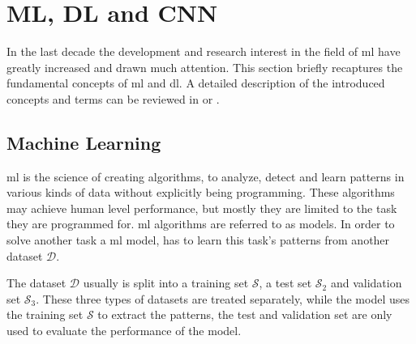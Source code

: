 
\section{ML, DL and CNN}\label{ord:ch2:sec1}

In the last decade the development and research interest in the field of \gls{ml} have greatly increased and drawn much attention. 
This section briefly recaptures the fundamental concepts of \gls{ml} and \gls{dl}.
A detailed description of the introduced concepts and terms can be reviewed in \cite{Ger17-HandsOn} or \cite{Goodfellow-et-al-2016}.


\subsection{Machine Learning}\label{ord:ch2:sec1:subsec1}

\gls{ml} is the science of creating algorithms, to analyze, detect and learn patterns in various kinds of data without explicitly being programming.
These algorithms may achieve human level performance, but mostly they are limited to the task they are programmed for.
\gls{ml} algorithms are referred to as models.
In order to solve another task a \gls{ml} model, has to learn this task's patterns from another dataset $\mathcal{D}$.

The dataset $\mathcal{D}$ usually is split into a training set $\mathcal{S}$, a test set $\mathcal{S}_2$ and validation set $\mathcal{S}_3$.
These three types of datasets are treated separately, while the model uses the training set $\mathcal{S}$ to extract the patterns, the test and validation set are only used to evaluate the performance of the model.

